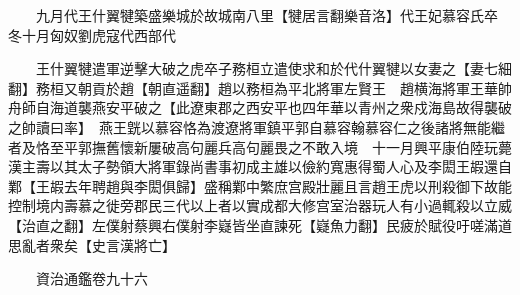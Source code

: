 　　九月代王什翼犍築盛樂城於故城南八里【犍居言翻樂音洛】代王妃慕容氏卒　冬十月匈奴劉虎寇代西部代

　　王什翼犍遣軍逆擊大破之虎卒子務桓立遣使求和於代什翼犍以女妻之【妻七細翻】務桓又朝貢於趙【朝直遥翻】趙以務桓為平北將軍左賢王　趙横海將軍王華帥舟師自海道襲燕安平破之【此遼東郡之西安平也四年華以青州之衆戍海島故得襲破之帥讀曰率】　燕王皝以慕容恪為渡遼將軍鎮平郭自慕容翰慕容仁之後諸將無能繼者及恪至平郭撫舊懷新屢破高句麗兵高句麗畏之不敢入境　十一月興平康伯陸玩薨　漢主壽以其太子勢領大將軍錄尚書事初成主雄以儉約寬惠得蜀人心及李閎王嘏還自鄴【王嘏去年聘趙與李閎俱歸】盛稱鄴中繁庶宫殿壯麗且言趙王虎以刑殺御下故能控制境内壽慕之徙旁郡民三代以上者以實成都大修宫室治器玩人有小過輒殺以立威【治直之翻】左僕射蔡興右僕射李嶷皆坐直諫死【嶷魚力翻】民疲於賦役吁嗟滿道思亂者衆矣【史言漢將亡】

　　資治通鑑卷九十六  
    


 


 



 

 
  







 


　　
　　
　
　
　


　　

　















	
	









































